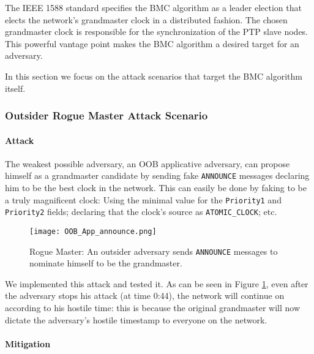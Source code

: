 \documentclass[11pt]{article}
\begin{document}
The IEEE 1588 standard specifies the BMC algorithm as a leader election that elects the network's grandmaster clock in a distributed fashion. The chosen grandmaster clock is responsible for the synchronization of the PTP slave nodes. This powerful vantage point makes the BMC algorithm a desired target for an adversary.

In this section we  focus on the attack scenarios that target the BMC algorithm itself.



\subsubsection{Outsider Rogue Master Attack Scenario}\label{bmc:scenrio1}

\paragraph{Attack}

The weakest possible adversary, an OOB applicative adversary, can propose himself as a grandmaster candidate by sending fake \texttt{ANNOUNCE} messages declaring him to be the best clock in the network. This can easily be done by faking to be a truly magnificent clock: Using the minimal value for the \texttt{Priority1} and \texttt{Priority2} fields; declaring that the clock's source as \texttt{ATOMIC_CLOCK}; etc.



\begin{figure}[t]

\centerline{\texttt{[image: OOB\_App\_announce.png]}}

\caption{Rogue Master: An outsider adversary sends \texttt{ANNOUNCE} messages to nominate himself to be the grandmaster.}

\label{Rogue Master}

\end{figure}



We implemented this attack and tested it. As can be seen in Figure \ref{Rogue Master}, even after the adversary stops his attack (at time 0:44), the network will continue on according to his hostile time: this is because the original grandmaster will now dictate the adversary's hostile timestamp to everyone on the network.



\paragraph{Mitigation}\label{bmc:scenrio1mit}
\end{document}

